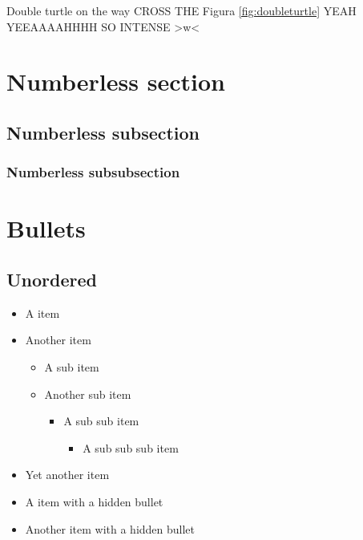 \documentclass[a4paper,12pt]{article}
\begin{document}
Double turtle on the way CROSS THE Figura \ref{fig:doubleturtle} YEAH YEEAAAAHHHH SO INTENSE >w<

\section*{Numberless section}
\subsection*{Numberless subsection}
\subsubsection*{Numberless subsubsection}

\section{Bullets}
\subsection{Unordered}
\begin{itemize}
    \item A item
    \item Another item
    \begin{itemize}
        \item A sub item
        \item Another sub item
        \begin{itemize}
            \item A sub sub item
            \begin{itemize}
                \item A sub sub sub item
            \end{itemize}
        \end{itemize}
    \end{itemize}
    \item Yet another item
    \item [] A item with a hidden bullet
    \item[] Another item with a hidden bullet
\end{itemize}
\end{document}
